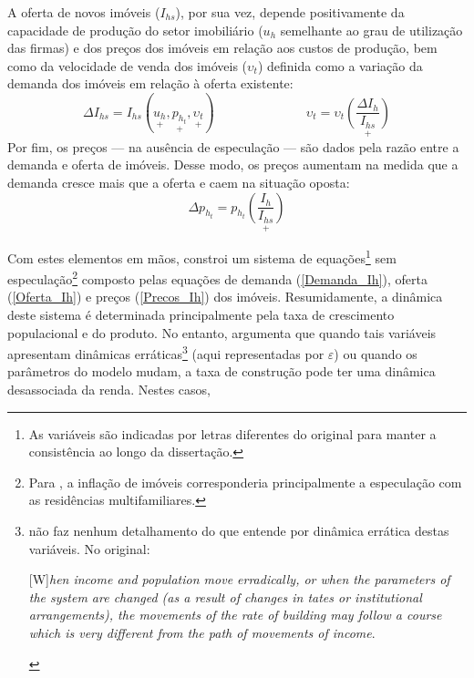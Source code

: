 A oferta de novos imóveis ($I_{hs}$), por sua vez, 
depende positivamente da capacidade de produção do setor imobiliário ($u_h$ semelhante ao grau de utilização das firmas) e dos preços dos imóveis em relação aos custos de produção, bem como da velocidade de venda dos imóveis ($\upsilon_t$) definida como a variação da demanda dos imóveis em relação à oferta existente:
\begin{equation}
\label{Oferta_Ih}
\Delta I_{hs} =  I_{hs}(\underset{+}{u_h}, \underset{+}{p_{h_t}}, \underset{+}{\upsilon_t}) \hspace{3cm} \upsilon_t = \upsilon_t\underset{+}{\left(\frac{\Delta I_h}{I_{hs}}\right)}
\end{equation}
Por fim, os preços --- na ausência de especulação --- são dados pela razão entre a demanda e oferta de imóveis.
Desse modo, os preços aumentam na medida que a demanda cresce mais que a oferta e caem na situação oposta:
\begin{equation}
\label{Precos_Ih}
\Delta p_{h_t} = p_{h_t}\underset{+}{\left(\frac{I_{h}}{I_{hs}}\right)}
\end{equation}

Com estes elementos em mãos, \textcite{duesenberry_investment_1958} constroi um sistema de equações\footnote{As variáveis são indicadas por letras diferentes do original para manter a consistência ao longo da dissertação.} sem especulação\footnote{Para \textcite{duesenberry_investment_1958}, a inflação de imóveis corresponderia principalmente a especulação com as residências multifamiliares.} composto pelas equações de demanda (\ref{Demanda_Ih}), oferta (\ref{Oferta_Ih}) e preços (\ref{Precos_Ih}) dos imóveis.
Resumidamente, a dinâmica deste sistema é determinada principalmente pela taxa de crescimento populacional e do produto. No entanto, \textcite{duesenberry_investment_1958} argumenta que quando tais variáveis apresentam dinâmicas erráticas\footnote{\textcite[p.~158]{duesenberry_investment_1958} não faz nenhum detalhamento do que entende por dinâmica errática destas variáveis. No original:

\begin{citacao}

[W]\textit{hen income and population move erradically, or when the parameters of the system are changed (as a result of changes in tates or institutional arrangements), the movements of the rate of building may follow a course which is very different from the path of movements of income}.
\end{citacao}

} (aqui representadas por $\varepsilon$) ou quando os parâmetros do modelo mudam, a taxa de construção pode ter uma dinâmica desassociada da renda. Nestes casos,

